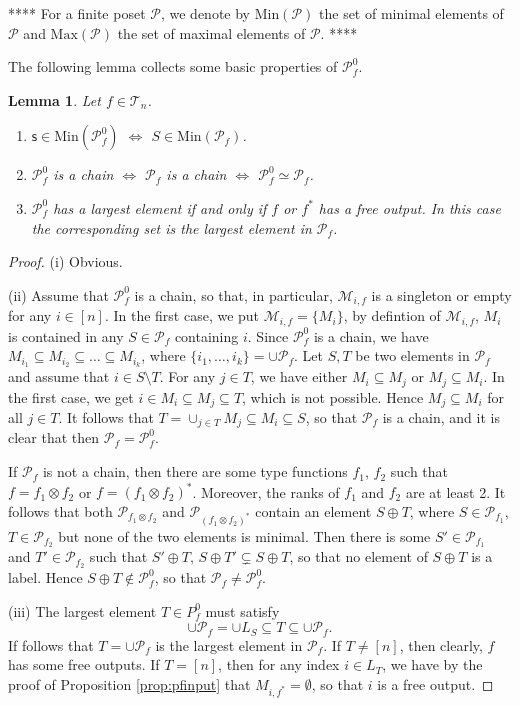 \documentclass[12pt]{article}
\newtheorem{lemma}{Lemma}
\theoremstyle{definition}
\theoremstyle{remark}
\def\Me{\mathcal M}
\def\Te{\mathcal T}
\def\Pe{\mathcal P}
\begin{document}
****
For a finite poset $\Pe$, we denote by $\mathrm{Min}(\Pe)$ the set of minimal elements of
$\Pe$ and $\mathrm{Max}(\Pe)$ the set of maximal elements of $\Pe$.
****

The following lemma collects some basic properties of $\Pe_f^0$.


\begin{lemma}\label{lemma:p0_basic} Let $f\in \Te_n$.
\begin{enumerate}
\item[(i)] $\mathsf{s}\in \mathrm{Min}(\Pe_f^0)$ $\iff$ $S\in \mathrm{Min}(\Pe_f)$.
\item[(ii)] $\Pe_f^0$ is a chain $\iff$  $\Pe_f$ is a chain $\iff$  $\Pe_f^0\simeq \Pe_f$.

\item[(iii)] $\Pe^0_f$ has a largest element if and only if $f$ or $f^*$ has a free
output. In this case  the corresponding set is the largest element in $\Pe_f$. 

\end{enumerate}
\end{lemma}


\begin{proof} 
(i) Obvious. 

(ii) Assume that $\Pe^0_f$ is a chain, so that, in particular,
 $\Me_{i,f}$ is a singleton or empty for any $i\in [n]$. In the first case, we put
 $\Me_{i,f}=\{M_i\}$, by defintion of $\Me_{i,f}$, $M_i$ is contained in any $S\in \Pe_f$ containing $i$.
Since
$\Pe^0_f$ is a chain, we have $M_{i_1}\subseteq M_{i_2}\subseteq\dots\subseteq M_{i_k}$,
where $\{i_1,\dots,i_k\}=\cup \Pe_f$.  Let $S,T$ be two
elements in $\Pe_f$ and assume that $i\in S\setminus T$. For any $j\in T$, we have either
$M_i\subseteq M_j$ or $M_j\subseteq M_i$. In the first case, we get $i\in M_i\subseteq
M_j\subseteq T$, which is not possible. Hence $M_j\subseteq M_i$ for all $j\in T$. It
follows that $T=\cup_{j\in T} M_j\subseteq M_i\subseteq S$, so that $\Pe_f$ is a chain,
and it is clear that then $\Pe_f=\Pe_f^0$. 

If $\Pe_f$ is not a chain, then there are some type
functions
$f_1$, $f_2$ such that $f=f_1\otimes f_2$ or $f=(f_1\otimes f_2)^*$. Moreover, the ranks
of $f_1$ and $f_2$ are at least 2. It follows that both $\Pe_{f_1\otimes f_2}$ and
$\Pe_{(f_1\otimes f_2)^*}$ contain an element $S\oplus T$, where $S\in \Pe_{f_1}$, $T\in
\Pe_{f_2}$ but none of the two elements is minimal. Then there is some $S'\in \Pe_{f_1}$
and $T'\in \Pe_{f_2}$ such that $S'\oplus T$, $S\oplus T'\subsetneq S\oplus T$, so that no
element of $S\oplus T$ is a label. Hence
$S\oplus T\notin
\Pe_f^0$, so that $\Pe_f\ne \Pe_f^0$. 

(iii) The largest element  $T\in P^0_f$ must satisfy 
\[
\cup\Pe_f=\cup L_S \subseteq T\subseteq \cup \Pe_f.
\]
 If follows that $T=\cup\Pe_f $ is the largest element in $\Pe_f$. If $T\ne [n]$, then
 clearly, $f$ has some free outputs. If $T=[n]$, then for any index $i\in L_T$, we have by
 the proof of Proposition \ref{prop:pfinput} that
 $M_{i,f^*}=\emptyset$, so that $i$ is a free output. 




\end{proof}
\end{document}
